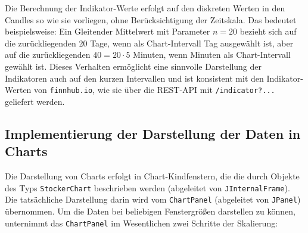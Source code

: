 \documentclass[fontsize=12pt, paper=a4, pagesize=auto, twoside=false, DIV=11, draft=false]{scrartcl}
\begin{document}
Die Berechnung der Indikator-Werte erfolgt auf den diskreten Werten in den Candles so wie sie vorliegen, ohne Berücksichtigung der Zeitskala. Das bedeutet beispielsweise: Ein Gleitender Mittelwert mit Parameter $n = 20$ bezieht sich auf die zurückliegenden 20 Tage, wenn als Chart-Intervall  Tag\grqq{} ausgewählt ist, aber auf die zurückliegenden $40 = 20 \cdot 5$ Minuten, wenn  Minuten\grqq{} als Chart-Intervall gewählt ist. Dieses Verhalten ermöglicht eine sinnvolle Darstellung der Indikatoren auch auf den kurzen Intervallen und ist konsistent mit den Indikator-Werten von \texttt{finnhub.io}, wie sie über die REST-API mit \texttt{/indicator?...} geliefert werden. 

\subsection{Implementierung der Darstellung der Daten in Charts}
Die Darstellung von Charts erfolgt in Chart-Kindfenstern, die die durch Objekte des Typs \texttt{StockerChart} beschrieben werden (abgeleitet von \texttt{JInternalFrame}). Die tatsächliche Darstellung darin wird vom \texttt{ChartPanel} (abgeleitet von \texttt{JPanel}) übernommen. Um die Daten bei beliebigen Fenstergrößen darstellen zu können, unternimmt das \texttt{ChartPanel} im Wesentlichen zwei Schritte der Skalierung:
\end{document}
